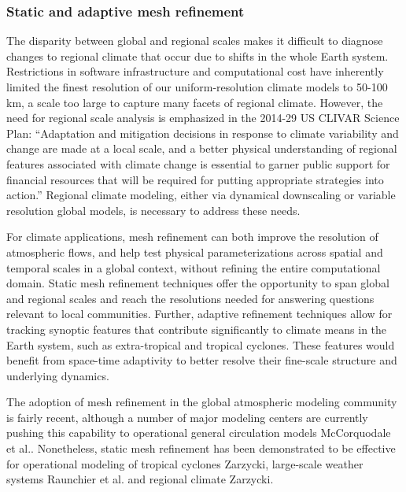 \documentclass[11pt]{article}
\begin{document}
\subsubsection{Static and adaptive mesh refinement} \label{sec:Refinement}

The disparity between global and regional scales makes it difficult to diagnose changes to regional climate that occur due to shifts in the whole Earth system.  Restrictions in software infrastructure and computational cost have inherently limited the finest resolution of our uniform-resolution climate models to 50-100 km, a scale too large to capture many facets of regional climate.  However, the need for regional scale analysis is emphasized in the 2014-29 US CLIVAR Science Plan: ``Adaptation and mitigation decisions in response to climate variability and change are made at a local scale, and a better physical understanding of regional features associated with climate change is essential to garner public support for financial resources that will be required for putting appropriate strategies into action.''  Regional climate modeling, either via dynamical downscaling or variable resolution global models, is necessary to address these needs.

For climate applications, mesh refinement can both improve the resolution of atmospheric flows, and help test physical parameterizations across spatial and temporal scales in a global context, without refining the entire computational domain.  Static mesh refinement techniques offer the opportunity to span global and regional scales and reach the resolutions needed for answering questions relevant to local communities.  Further, adaptive refinement techniques allow for tracking synoptic features that contribute significantly to climate means in the Earth system, such as extra-tropical and tropical cyclones.  These features would benefit from space-time adaptivity to better resolve their fine-scale structure and underlying dynamics.

The adoption of mesh refinement in the global atmospheric modeling community is fairly recent, although a number of major modeling centers are currently pushing this capability to operational general circulation models \cite{skamarock2012mpas, LMHSJL2013MWR, CMZCJMAT2013MWR} {\color{red} McCorquodale et al.}.   Nonetheless, static mesh refinement has been demonstrated to be effective for operational modeling of tropical cyclones {\color{red}Zarzycki}, large-scale weather systems {\color{red}Raunchier et al.} and regional climate {\color{red}Zarzycki}.
\end{document}
